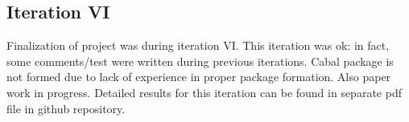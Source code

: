 \subsection{Iteration VI}
Finalization of project was during iteration VI. This iteration was ok: in fact, some comments/test were written during previous iterations. Cabal package is not formed due to lack of experience in proper package formation. Also paper work in progress.
Detailed results for this iteration can be found in separate pdf file\cite{khazhix6} in github repository.